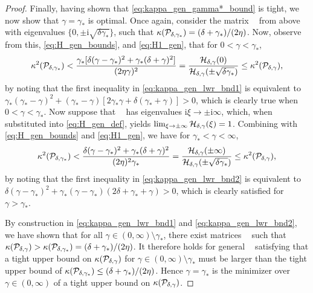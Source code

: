 \documentclass[a4paper,10pt]{article}
\DeclareMathOperator{\cL}{\widehat{\mathcal{L}}}
\begin{document}
\begin{proof}
Finally, having shown that \eqref{eq:kappa_gen_gamma*_bound} is tight, we now show that 
$\gamma = \gamma_*$ is optimal. Once again, consider the matrix $\cL$ from above
with eigenvalues $\{0, \pm \mathrm{i}\sqrt{\delta \gamma_*} \}$, such that
$\kappa({\cal P}_{\delta,\gamma_*})
=
(\delta + \gamma_*)/(2\eta)$. Now, observe from this, \eqref{eq:H_gen_bounds},
and \eqref{eq:H1_gen}, that for $0 < \gamma < \gamma_*$,
%
\begin{align}
\label{eq:kappa_gen_lwr_bnd1}
\kappa^2({\cal P}_{\delta,\gamma_*})
<
\frac{\gamma_*[\delta(\gamma - \gamma_*)^2 + \gamma_*(\delta + \gamma)^2]}{(2 \eta \gamma)^2}
=
\frac{{\cal H}_{\delta,\gamma}(0)}{{\cal H}_{\delta,\gamma}(\pm \sqrt{\delta \gamma_*})}
\leq
\kappa^2({\cal P}_{\delta,\gamma}),
\end{align}
by noting that the first inequality in \eqref{eq:kappa_gen_lwr_bnd1} is equivalent to 
$\gamma_*(\gamma_* - \gamma)^2 + (\gamma_* - \gamma) [2 \gamma_*  \gamma + \delta(\gamma_* + \gamma)] > 0$, which is clearly true when $0 < \gamma < \gamma_*$.
Now suppose that $\cL$ has eigenvalues $\mathrm{i} \xi \to \pm \mathrm{i} \infty$,
which, when substituted into \eqref{eq:H_gen_def}, yields
$\lim_{\xi \to \pm \infty} {\cal H}_{\delta,\gamma}(\xi) = 1$.
Combining with \eqref{eq:H_gen_bounds} and \eqref{eq:H1_gen}, we have 
for $\gamma_* < \gamma < \infty$,
%
\begin{align}
\label{eq:kappa_gen_lwr_bnd2}
\kappa^2({\cal P}_{\delta,\gamma_*})
< 
\frac{\delta(\gamma - \gamma_*)^2 + \gamma_*(\delta + \gamma)^2}{(2 \eta )^2 \gamma_*}
=
\frac{{\cal H}_{\delta,\gamma}(\pm \infty)}{{\cal H}_{\delta,\gamma}(\pm \sqrt{\delta \gamma_*})}
\leq
\kappa^2({\cal P}_{\delta,\gamma}),
\end{align}
by noting that the first inequality in \eqref{eq:kappa_gen_lwr_bnd2} is equivalent to 
$\delta (\gamma - \gamma_*)^2 + \gamma_*(\gamma - \gamma_*) (2 \delta + \gamma_* + \gamma) > 0$, which is clearly satisfied for $\gamma > \gamma_*$.
%

By construction in \eqref{eq:kappa_gen_lwr_bnd1} and \eqref{eq:kappa_gen_lwr_bnd2},
we have shown that for all $\gamma \in (0, \infty) \setminus \gamma_*$, there exist
matrices $\cL$ such that $\kappa({\cal P}_{\delta,\gamma}) > \kappa({\cal
P}_{\delta,\gamma_*}) = (\delta + \gamma_*)/(2\eta)$. It therefore holds for general $\cL$
satisfying  that a tight upper bound on $\kappa({\cal P}_{\delta,\gamma})$
for $\gamma \in (0, \infty) \setminus \gamma_*$ must be larger than the tight upper
bound of $\kappa({\cal P}_{\delta,\gamma_*}) \leq (\delta + \gamma_*)/(2\eta)$. Hence $\gamma=\gamma_*$ is the
minimizer over $\gamma \in (0, \infty)$ of a tight upper bound on $\kappa({\cal
P}_{\delta,\gamma})$.
\end{proof}
%
\end{document}
